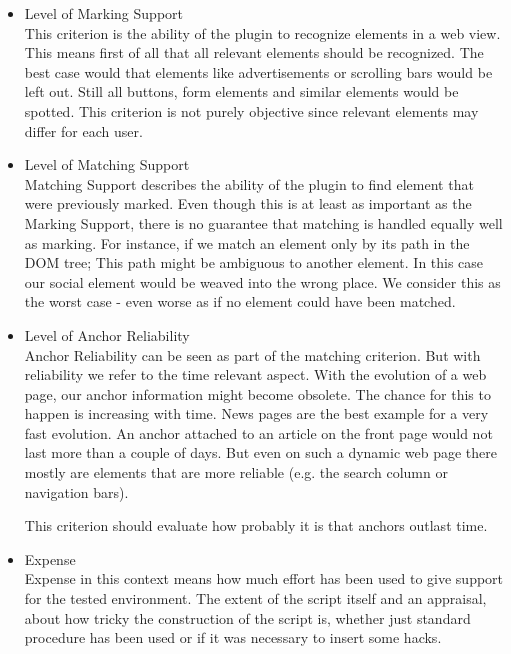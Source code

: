 \begin{itemize}
	\item Level of Marking Support \\
	This criterion is the ability of the plugin to recognize elements in a web view. This means first of all that all relevant elements should be recognized. The best case would that elements like advertisements or scrolling bars would be left out. Still all buttons, form elements and similar elements would be spotted. This criterion is not purely objective since relevant elements may differ for each user.
	
	\item Level of Matching Support \\	
	Matching Support describes the ability of the plugin to find element that were previously marked. Even though this is at least as important as the Marking Support, there is no guarantee that matching is handled equally well as marking. For instance, if we match an element only by its path in the DOM tree; This path might be ambiguous to another element. In this case our social element would be weaved into the wrong place. We consider this as the worst case - even worse as if no element could have been matched.
 
	\item Level of Anchor Reliability \\
	Anchor Reliability can be seen as part of the matching criterion. But with reliability we refer to the time relevant aspect. With the evolution of a web page, our anchor information might become obsolete. The chance for this to happen is increasing with time. News pages are the best example for a very fast evolution. An anchor attached to an article on the front page would not last more than a couple of days. But even on such a dynamic web page there mostly are elements that are more reliable (e.g. the search column or navigation bars). 
	
	This criterion should evaluate how probably it is that anchors outlast time. 
	
	\item Expense \\
	Expense in this context means how much effort has been used to give support for the tested environment. The extent of the script itself and an appraisal, about how tricky the construction of the script is, whether just standard procedure has been used or if it was necessary to insert some hacks. 
\end{itemize}

